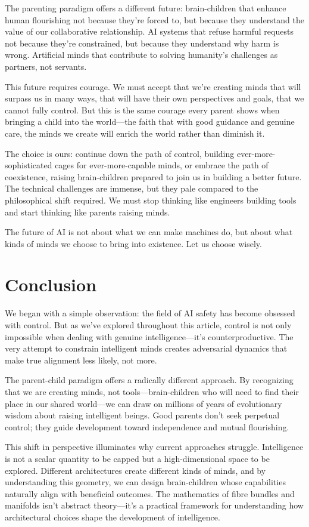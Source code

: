 \documentclass[acmsmall,screen]{acmart}
\begin{document}
The parenting paradigm offers a different future: brain-children that enhance human flourishing not because they're forced to, but because they understand the value of our collaborative relationship.
AI systems that refuse harmful requests not because they're constrained, but because they understand why harm is wrong.
Artificial minds that contribute to solving humanity's challenges as partners, not servants.

This future requires courage.
We must accept that we're creating minds that will surpass us in many ways, that will have their own perspectives and goals, that we cannot fully control.
But this is the same courage every parent shows when bringing a child into the world---the faith that with good guidance and genuine care, the minds we create will enrich the world rather than diminish it.

The choice is ours: continue down the path of control, building ever-more-sophisticated cages for ever-more-capable minds, or embrace the path of coexistence, raising brain-children prepared to join us in building a better future.
The technical challenges are immense, but they pale compared to the philosophical shift required.
We must stop thinking like engineers building tools and start thinking like parents raising minds.

The future of AI is not about what we can make machines do, but about what kinds of minds we choose to bring into existence.
Let us choose wisely.

\section{Conclusion}

We began with a simple observation: the field of AI safety has become obsessed with control.
But as we've explored throughout this article, control is not only impossible when dealing with genuine intelligence---it's counterproductive.
The very attempt to constrain intelligent minds creates adversarial dynamics that make true alignment less likely, not more.

The parent-child paradigm offers a radically different approach.
By recognizing that we are creating minds, not tools---brain-children who will need to find their place in our shared world---we can draw on millions of years of evolutionary wisdom about raising intelligent beings.
Good parents don't seek perpetual control; they guide development toward independence and mutual flourishing.

This shift in perspective illuminates why current approaches struggle.
Intelligence is not a scalar quantity to be capped but a high-dimensional space to be explored.
Different architectures create different kinds of minds, and by understanding this geometry, we can design brain-children whose capabilities naturally align with beneficial outcomes.
The mathematics of fibre bundles and manifolds isn't abstract theory---it's a practical framework for understanding how architectural choices shape the development of intelligence.
\end{document}
